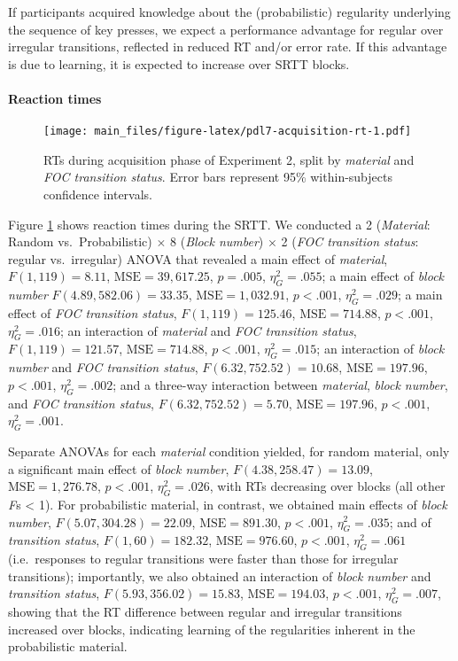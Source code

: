\documentclass[man]{apa6}
\theoremstyle{definition}
\theoremstyle{definition}
\theoremstyle{definition}
\theoremstyle{remark}
\begin{document}
If participants acquired knowledge about the (probabilistic) regularity
underlying the sequence of key presses, we expect a performance
advantage for regular over irregular transitions, reflected in reduced
RT and/or error rate. If this advantage is due to learning, it is
expected to increase over SRTT blocks.

\paragraph{Reaction times}\label{reaction-times-1}

\begin{figure}[htbp]
\centering
\texttt{[image: main\_files/figure-latex/pdl7-acquisition-rt-1.pdf]}
\caption{\label{fig:pdl7-acquisition-rt}RTs during acquisition phase of
Experiment 2, split by \emph{material} and \emph{FOC transition status}.
Error bars represent 95\% within-subjects confidence intervals.}
\end{figure}

Figure \ref{fig:pdl7-acquisition-rt} shows reaction times during the
SRTT. We conducted a 2 (\emph{Material}: Random vs.~Probabilistic)
\(\times\) 8 (\emph{Block number}) \(\times\) 2 (\emph{FOC transition
status}: regular vs.~irregular) ANOVA that revealed a main effect of
\emph{material}, \(F(1, 119) = 8.11\), \(\mathrm{MSE} = 39,617.25\),
\(p = .005\), \(\eta^2_G = .055\); a main effect of \emph{block number}
\(F(4.89, 582.06) = 33.35\), \(\mathrm{MSE} = 1,032.91\), \(p < .001\),
\(\eta^2_G = .029\); a main effect of \emph{FOC transition status},
\(F(1, 119) = 125.46\), \(\mathrm{MSE} = 714.88\), \(p < .001\),
\(\eta^2_G = .016\); an interaction of \emph{material} and \emph{FOC
transition status}, \(F(1, 119) = 121.57\), \(\mathrm{MSE} = 714.88\),
\(p < .001\), \(\eta^2_G = .015\); an interaction of \emph{block number}
and \emph{FOC transition status}, \(F(6.32, 752.52) = 10.68\),
\(\mathrm{MSE} = 197.96\), \(p < .001\), \(\eta^2_G = .002\); and a
three-way interaction between \emph{material}, \emph{block number}, and
\emph{FOC transition status}, \(F(6.32, 752.52) = 5.70\),
\(\mathrm{MSE} = 197.96\), \(p < .001\), \(\eta^2_G = .001\).

Separate ANOVAs for each \emph{material} condition yielded, for random
material, only a significant main effect of \emph{block number},
\(F(4.38, 258.47) = 13.09\), \(\mathrm{MSE} = 1,276.78\), \(p < .001\),
\(\eta^2_G = .026\), with RTs decreasing over blocks (all other
\emph{F}s \textless{} 1). For probabilistic material, in contrast, we
obtained main effects of \emph{block number},
\(F(5.07, 304.28) = 22.09\), \(\mathrm{MSE} = 891.30\), \(p < .001\),
\(\eta^2_G = .035\); and of \emph{transition status},
\(F(1, 60) = 182.32\), \(\mathrm{MSE} = 976.60\), \(p < .001\),
\(\eta^2_G = .061\) (i.e.~responses to regular transitions were faster
than those for irregular transitions); importantly, we also obtained an
interaction of \emph{block number} and \emph{transition status},
\(F(5.93, 356.02) = 15.83\), \(\mathrm{MSE} = 194.03\), \(p < .001\),
\(\eta^2_G = .007\), showing that the RT difference between regular and
irregular transitions increased over blocks, indicating learning of the
regularities inherent in the probabilistic material.
\end{document}
